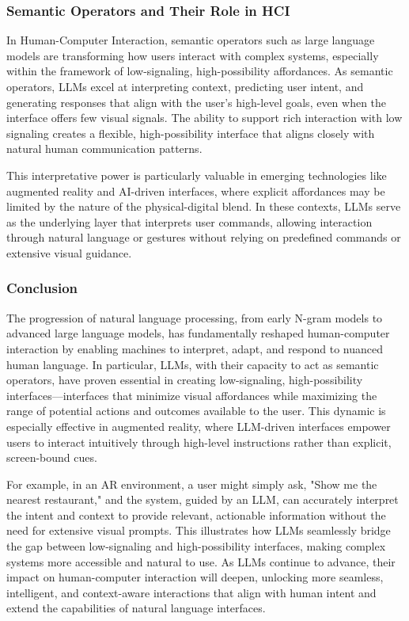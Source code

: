 \subsubsection{ Semantic Operators and Their Role in HCI}

In Human-Computer Interaction, semantic operators such as large language models are transforming how users interact with complex systems, especially within the framework of low-signaling, high-possibility affordances.
As semantic operators, LLMs excel at interpreting context, predicting user intent, and generating responses that align with the user’s high-level goals, even when the interface offers few visual signals.
The ability to support rich interaction with low signaling creates a flexible, high-possibility interface that aligns closely with natural human communication patterns.

This interpretative power is particularly valuable in emerging technologies like augmented reality and AI-driven interfaces, where explicit affordances may be limited by the nature of the physical-digital blend.
In these contexts, LLMs serve as the underlying layer that interprets user commands, allowing interaction through natural language or gestures without relying on predefined commands or extensive visual guidance.

\subsubsection{ Conclusion }

The progression of natural language processing, from early N-gram models to advanced large language models, has fundamentally reshaped human-computer interaction by enabling machines to interpret, adapt, and respond to nuanced human language.
In particular, LLMs, with their capacity to act as semantic operators, have proven essential in creating low-signaling, high-possibility interfaces—interfaces that minimize visual affordances while maximizing the range of potential actions and outcomes available to the user.
This dynamic is especially effective in augmented reality, where LLM-driven interfaces empower users to interact intuitively through high-level instructions rather than explicit, screen-bound cues.

For example, in an AR environment, a user might simply ask, "Show me the nearest restaurant," and the system, guided by an LLM, can accurately interpret the intent and context to provide relevant, actionable information without the need for extensive visual prompts.
This illustrates how LLMs seamlessly bridge the gap between low-signaling and high-possibility interfaces, making complex systems more accessible and natural to use.
As LLMs continue to advance, their impact on human-computer interaction will deepen, unlocking more seamless, intelligent, and context-aware interactions that align with human intent and extend the capabilities of natural language interfaces.

